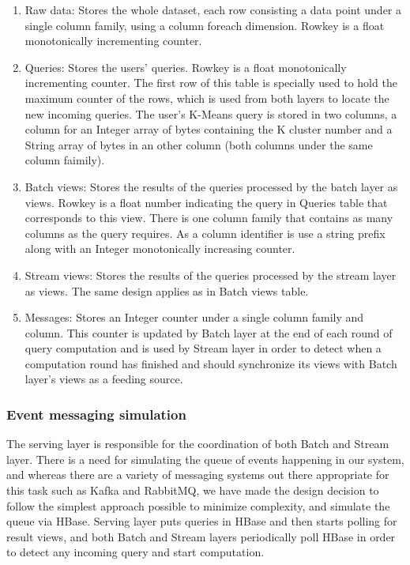 \documentclass{lmproj}
\begin{document}
\begin{enumerate}
	\item Raw data: Stores the whole dataset, each row consisting a data point under a single column family, using a column foreach dimension. Rowkey is a float monotonically incrementing counter.
	\item Queries: Stores the users' queries. Rowkey is a float monotonically incrementing counter. The first row of this table is specially used to hold the maximum counter of the rows, which is used from both layers to locate the new incoming queries. The user's K-Means query is stored in two columns, a column for an Integer array of bytes containing the K cluster number and a String array of bytes in an other column (both columns under the same column faimily).
	\item Batch views: Stores the results of the queries processed by the batch layer as views. Rowkey is a float number indicating the query in Queries table that corresponds to this view. There is one column family that contains as many columns as the query requires. As a column identifier is use a string prefix along with an Integer monotonically increasing counter.
	\item Stream views: Stores the results of the queries processed by the stream layer as views. The same design applies as in Batch views table.
	\item Messages: Stores an Integer counter under a single column family and column. This counter is updated by Batch layer at the end of each round of query computation and is used by Stream layer in order to detect when a computation round has finished and should synchronize its views with Batch layer's views as a feeding source. 
\end{enumerate}

\subsubsection{Event messaging simulation}
The serving layer is responsible for the coordination of both Batch and Stream layer. There is a need for simulating the queue of events happening in our system, and whereas there are a variety of messaging systems out there appropriate for this task such as Kafka and RabbitMQ, we have made the design decision to follow the simplest approach possible to minimize complexity, and simulate the queue via HBase. Serving layer puts queries in HBase and then starts polling for result views, and both Batch and Stream layers periodically poll HBase in order to detect any incoming query and start computation.
\end{document}
